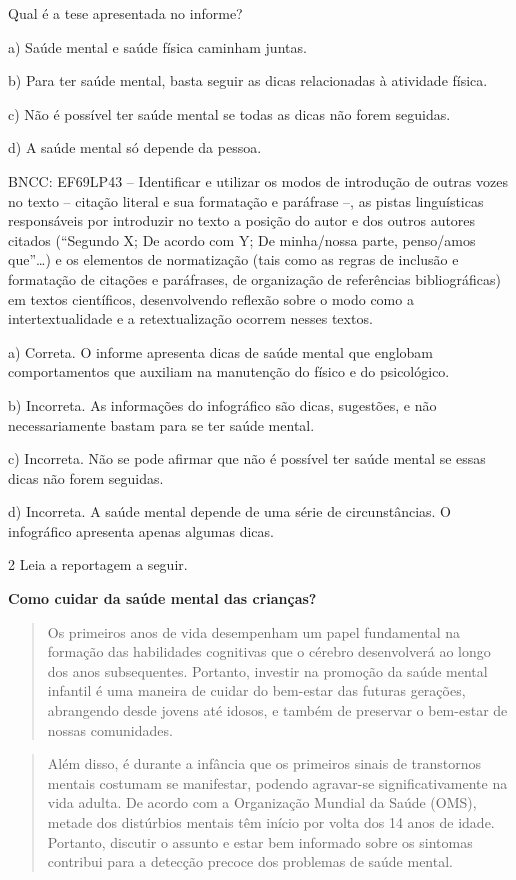 Qual é a tese apresentada no informe?

a) Saúde mental e saúde física caminham juntas.

b) Para ter saúde mental, basta seguir as dicas relacionadas à atividade
física.

c) Não é possível ter saúde mental se todas as dicas não forem seguidas.

d) A saúde mental só depende da pessoa.

BNCC: EF69LP43 -- Identificar e utilizar os modos de introdução de
outras vozes no texto -- citação literal e sua formatação e paráfrase
--, as pistas linguísticas responsáveis por introduzir no texto a
posição do autor e dos outros autores citados (``Segundo X; De acordo
com Y; De minha/nossa parte, penso/amos que''\ldots) e os elementos de
normatização (tais como as regras de inclusão e formatação de citações e
paráfrases, de organização de referências bibliográficas) em textos
científicos, desenvolvendo reflexão sobre o modo como a
intertextualidade e a retextualização ocorrem nesses textos.

a) Correta. O informe apresenta dicas de saúde mental que englobam
comportamentos que auxiliam na manutenção do físico e do psicológico.

b) Incorreta. As informações do infográfico são dicas, sugestões, e não
necessariamente bastam para se ter saúde mental.

c) Incorreta. Não se pode afirmar que não é possível ter saúde mental se
essas dicas não forem seguidas.

d) Incorreta. A saúde mental depende de uma série de circunstâncias. O
infográfico apresenta apenas algumas dicas.

\num{2} Leia a reportagem a seguir.

\textbf{Como cuidar da saúde mental das crianças?}

\begin{quote}
Os primeiros anos de vida desempenham um papel fundamental na formação
das habilidades cognitivas que o cérebro desenvolverá ao longo dos anos
subsequentes. Portanto, investir na promoção da saúde mental infantil é
uma maneira de cuidar do bem-estar das futuras gerações, abrangendo
desde jovens até idosos, e também de preservar o bem-estar de nossas
comunidades.
\end{quote}

\begin{quote}
Além disso, é durante a infância que os primeiros sinais de transtornos
mentais costumam se manifestar, podendo agravar-se significativamente na
vida adulta. De acordo com a Organização Mundial da Saúde (OMS), metade
dos distúrbios mentais têm início por volta dos 14 anos de idade.
Portanto, discutir o assunto e estar bem informado sobre os sintomas
contribui para a detecção precoce dos problemas de saúde mental.
\end{quote}

